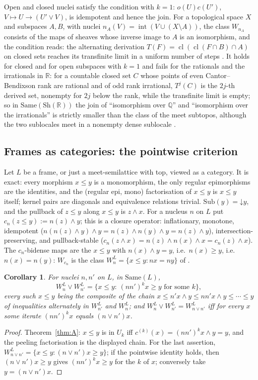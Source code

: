 \documentclass[11pt]{amsart}
\newtheorem{cor}[thm]{Corollary}
\theoremstyle{definition}
\newcommand{\Same}{\mathrm{Same}}
\newcommand{\Sh}{\mathrm{Sh}}
\newcommand{\Sub}{\mathrm{Sub}}
\begin{document}
Open and closed nuclei satisfy the condition with $k=1$: $o(U)c(U')$,
$V\mapsto U\to(U'\vee V)$, is idempotent and hence the join. For a
topological space $X$ and subspaces $A,B$, with nuclei $n_A(V)=
\operatorname{int}(V\cup(X\setminus A))$, the class $W_{n_A}$ consists of the
maps of sheaves whose inverse image to $A$ is an isomorphism, and the
condition reads: the alternating derivation $T(F)=\operatorname{cl}
(\operatorname{cl}(F\cap B)\cap A)$ on closed sets reaches its transfinite
limit in a uniform number of steps \cite[Prop.~7.5]{Stabjoin}. It holds for
closed and for open subspaces with $k=1$ and fails for the rationals and
the irrationals in $\mathbb R$: for a countable closed set $C$ whose points
of even Cantor--Bendixson rank are rational and of odd rank irrational,
$T^j(C)$ is the $2j$-th derived set, nonempty for $2j$ below the rank, while
the transfinite limit is empty; so in $\Same(\Sh(\mathbb R))$ the join of
``isomorphism over $\mathbb Q$'' and ``isomorphism over the irrationals'' is
strictly smaller than the class of the meet subtopos, although the two
sublocales meet in a nonempty dense sublocale \cite[Ex.~7.6]{Stabjoin}.

\subsection{Frames as categories: the pointwise criterion}\label{sub:frame}
Let $L$ be a frame, or just a meet-semilattice with top, viewed as a
category. It is exact: every morphism $x\le y$ is a monomorphism, the only
regular epimorphisms are the identities, and the (regular epi, mono)
factorisation of $x\le y$ is $x\le y$ itself; kernel pairs are diagonals and
equivalence relations trivial. $\Sub(y)=\mathord\downarrow y$, and the
pullback of $z\le y$ along $x\le y$ is $z\wedge x$. For a nucleus $n$ on $L$
put $c_n(z\le y):=n(z)\wedge y$; this is a closure operator: inflationary,
monotone, idempotent ($n(n(z)\wedge y)\wedge y=n(z)\wedge n(y)\wedge y=n(z)
\wedge y$), intersection-preserving, and pullback-stable
($c_n(z\wedge x)=n(z)\wedge n(x)\wedge x=c_n(z)\wedge x$). The $c_n$-bidense
maps are the $x\le y$ with $n(x)\wedge y=y$, i.e.\ $n(x)\ge y$, i.e.\
$n(x)=n(y)$: $W_{c_n}$ is the class $W_n^L=\{x\le y:nx=ny\}$ of
\cite[Thm.~1.1]{Fuzzysame}.

\begin{cor}\label{cor:frame}
For nuclei $n,n'$ on $L$, in $\Same(L)$,
\[
W_n^L\vee W_{n'}^L=\{x\le y:\ (nn')^kx\ge y\text{ for some }k\},
\]
every such $x\le y$ being the composite of the chain $x\le n'x\wedge y\le
nn'x\wedge y\le\cdots\le y$ of inequalities alternately in $W_{n'}^L$ and
$W_n^L$; and $W_n^L\vee W_{n'}^L=W_{n\vee n'}^L$ iff for every $x$ some
iterate $(nn')^kx$ equals $(n\vee n')x$.
\end{cor}
\begin{proof}
Theorem~\ref{thm:A}: $x\le y$ is in $U_k$ iff $c^{(k)}(x)=(nn')^kx\wedge y=y$,
and the peeling factorisation is the displayed chain. For the last
assertion, $W^L_{n\vee n'}=\{x\le y:(n\vee n')x\ge y\}$; if the pointwise
identity holds, then $(n\vee n')x\ge y$ gives $(nn')^kx\ge y$ for the $k$ of
$x$; conversely take $y=(n\vee n')x$.
\end{proof}
\end{document}
